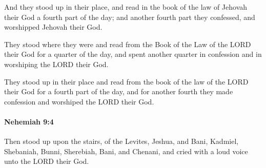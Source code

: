			\begin{versebox}
					\item[BHS] 
					\item[LXX] 
					\item[ASV] And they stood up in their place, and read in the book of the law of Jehovah their God a fourth part of the day; and another fourth part they confessed, and worshipped Jehovah their God.
					\item[NIV] They stood where they were and read from the Book of the Law of the LORD their God for a quarter of the day, and spent another quarter in confession and in worshiping the LORD their God.
					\item[NRSV] They stood up in their place and read from the book of the law of the LORD their God for a fourth part of the day, and for another fourth they made confession and worshiped the LORD their God.
			\end{versebox}

		\paragraph{Nehemiah 9:4} %
			\label{NEHEMIAH-9-4}

			Then stood up upon the stairs, of the Levites, Jeshua, and Bani, Kadmiel, Shebaniah, Bunni, Sherebiah, Bani, and Chenani, and cried with a loud voice unto the LORD their God.

